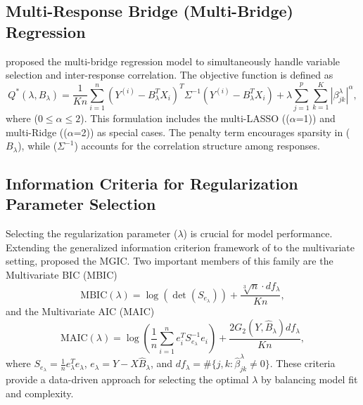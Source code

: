 \documentclass[twoside]{article}
\begin{document}
\subsection{Multi-Response Bridge (Multi-Bridge) Regression}
\cite{ghatari2024} proposed the multi-bridge regression model to simultaneously handle variable selection and inter-response correlation. The objective function is defined as
\begin{equation}\label{eq:obj}
Q^{*}(\lambda ,B_{\lambda}) = \frac{1}{Kn}\sum_{i = 1}^{n}(Y^{(i)} - B_{\lambda}^{T}X_{i})^{T}\Sigma^{-1}(Y^{(i)} - B_{\lambda}^{T}X_{i}) + \lambda \sum_{j=1}^{p}\sum_{k=1}^{K}|\beta_{jk}^{\lambda}|^{\alpha},
\end{equation}
where ($ 0 \leq \alpha \leq 2 $). This formulation includes the multi-LASSO (($ \alpha $=1)) and multi-Ridge (($ \alpha $=2)) as special cases. The penalty term encourages sparsity in ($B_ \lambda $), while ($ \Sigma^{-1} $) accounts for the correlation structure among responses.



\subsection{Information Criteria for Regularization Parameter Selection}



Selecting the regularization parameter ($ \lambda $) is crucial for model performance. Extending the generalized information criterion framework of \cite{zhang2010} to the multivariate setting, \cite{ghatari2024} proposed the MGIC. Two important members of this family are the Multivariate BIC (MBIC)
\[
\text{MBIC}(\lambda) = \log(\det(S_{e_\lambda})) + \frac{\sqrt[3]{n} \cdot df_\lambda}{Kn},
\]
and the Multivariate AIC (MAIC)
\[
\text{MAIC}(\lambda) = \log\left(\frac{1}{n}\sum_{i=1}^n e_i^T S_{e_\lambda}^{-1} e_i\right) + \frac{2 G_2(Y, \hat{B}_\lambda) df_\lambda}{Kn},
\]
where $S_{e_\lambda} = \frac{1}{n} e_\lambda^T e_\lambda$, $e_\lambda = Y - X\hat{B}_\lambda$, and $df_\lambda = \#\{j,k: \hat{\beta}_{jk}^\lambda \neq 0\}$. These criteria provide a data-driven approach for selecting the optimal $ \lambda $ by balancing model fit and complexity.
\end{document}
